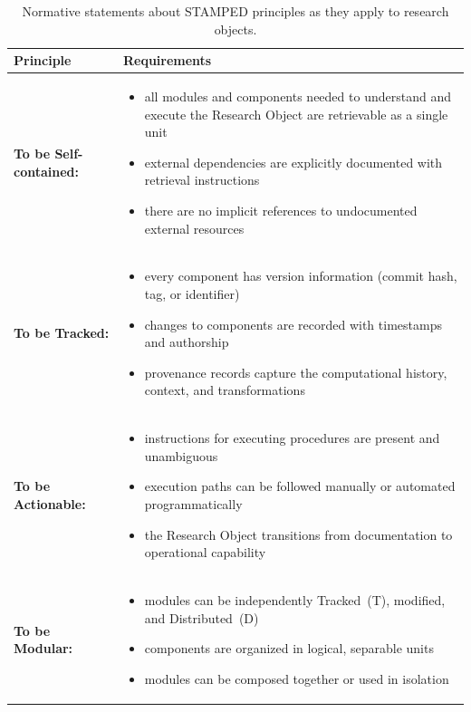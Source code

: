 \documentclass{article}
\begin{document}
\begin{table}[htbp]
\centering
\caption{Normative statements about STAMPED principles as they apply to research objects.}
\begin{tabular}{|l|p{}|}
\hline
\textbf{Principle} & \textbf{Requirements} \\
\hline
\textbf{To be Self-contained:} &
\begin{itemize}[noitemsep,topsep=0pt,leftmargin=*]
  \item all modules and components needed to understand and execute the Research Object are retrievable as a single unit
  \item external dependencies are explicitly documented with retrieval instructions
  \item there are no implicit references to undocumented external resources
\end{itemize} \\
\hline
\textbf{To be Tracked:} &
\begin{itemize}[noitemsep,topsep=0pt,leftmargin=*]
  \item every component has version information (commit hash, tag, or identifier)
  \item changes to components are recorded with timestamps and authorship
  \item provenance records capture the computational history, context, and transformations
\end{itemize} \\
\hline
\textbf{To be Actionable:} &
\begin{itemize}[noitemsep,topsep=0pt,leftmargin=*]
  \item instructions for executing procedures are present and unambiguous
  \item execution paths can be followed manually or automated programmatically
  \item the Research Object transitions from documentation to operational capability
\end{itemize} \\
\hline
\textbf{To be Modular:} &
\begin{itemize}[noitemsep,topsep=0pt,leftmargin=*]
  \item modules can be independently Tracked~(T), modified, and Distributed~(D)
  \item components are organized in logical, separable units
  \item modules can be composed together or used in isolation
\end{itemize} \\

\end{tabular}
\end{table}
\end{document}
